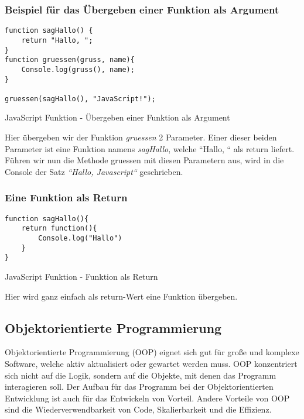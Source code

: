 \subsubsection{Beispiel für das Übergeben einer Funktion als Argument}
\begin{code}[htp]
\begin{lstlisting}
function sagHallo() {
    return "Hallo, ";
}
function gruessen(gruss, name){
    Console.log(gruss(), name);
}

gruessen(sagHallo(), "JavaScript!");
\end{lstlisting}
\caption{JavaScript Funktion - Übergeben einer Funktion als Argument}
\end{code}
Hier übergeben wir der Funktion \textit{gruessen} 2 Parameter. Einer dieser beiden Parameter ist eine
Funktion namens \textit{sagHallo}, welche ``Hallo, `` als return liefert. Führen wir nun 
die Methode gruessen mit diesen Parametern aus, wird in die Console der Satz 
\textit{``Hallo, Javascript``} geschrieben.

\subsubsection{Eine Funktion als Return}
\begin{code}[htp]
\begin{lstlisting}
function sagHallo(){
    return function(){
        Console.log("Hallo")
    }
}
\end{lstlisting}
\caption{JavaScript Funktion - Funktion als Return}
\end{code}
Hier wird ganz einfach als return-Wert eine Funktion übergeben.

\subsection{Objektorientierte Programmierung}
Objektorientierte Programmierung (OOP) eignet sich gut für große und komplexe Software, welche aktiv 
aktualisiert oder gewartet werden muss. OOP konzentriert sich nicht auf die Logik, sondern auf die 
Objekte, mit denen das Programm interagieren soll. Der Aufbau für das Programm bei der 
Objektorientierten Entwicklung ist auch für das Entwickeln von Vorteil. Andere Vorteile von OOP 
sind die Wiederverwendbarkeit von Code, Skalierbarkeit und die Effizienz.~\cite{OOP}

\newpage
